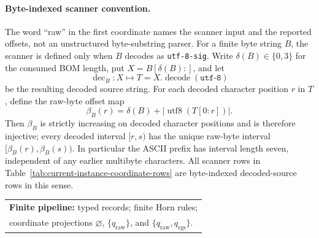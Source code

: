 \documentclass[runningheads]{llncs}
\DeclareRobustCommand{\auditcode}[1]{\mbox{\normalfont\ttfamily\detokenize{#1}}}
\newcommand{\rawBeginTokenCoord}{q_{\mathrm{raw}}}
\newcommand{\qlex}{\rawBeginTokenCoord}
\newcommand{\qrgs}{q_{\mathrm{rgs}}}
\begin{document}
\paragraph{Byte-indexed scanner convention.}
The word ``raw'' in the first coordinate names the scanner input and the reported
offsets, not an unstructured byte-substring parser.  For a finite byte string
\(B\), the scanner is defined only when \(B\) decodes as \texttt{utf-8-sig}.
Write \(\delta(B)\in\{0,3\}\) for the consumed BOM length, put
\(X=B[\delta(B):]\), and let
\[
\operatorname{dec}_B:X\mapsto T=X.\operatorname{decode}(\texttt{utf-8})
\]
be the resulting decoded source string.  For each decoded character position
\(r\) in \(T\), define the raw-byte offset map
\[
\beta_B(r)=\delta(B)+\bigl|\operatorname{utf8}(T[0:r])\bigr|.
\]
Then \(\beta_B\) is strictly increasing on decoded character positions and is
therefore injective; every decoded interval \([r,s)\) has the unique raw-byte
interval \([\beta_B(r),\beta_B(s))\).  In particular the ASCII prefix
\auditcode{\\begin\{} has interval length seven, independent of any earlier
multibyte characters.  All scanner rows in Table~\ref{tab:current-instance-coordinate-rows}
are byte-indexed decoded-source rows in this sense.

\begin{center}
\small
\begin{tabular}{@{}l@{}}
\textbf{Finite pipeline:} typed records; finite Horn rules;\\
coordinate projections \(\varnothing\), \(\{\qlex\}\), and
\(\{\qlex,\qrgs\}\).
\end{tabular}
\end{center}
\end{document}
